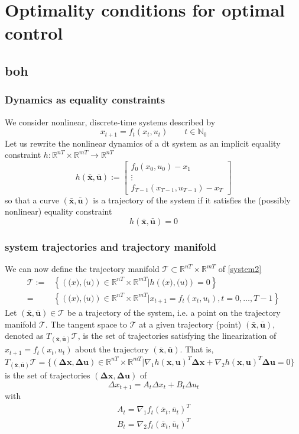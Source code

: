 \documentclass[openany]{book}
\newcommand{\R}{\mathbb{R}} %
\newcommand{\N}{\mathbb{N}} %
\newcommand{\traj}{(\bar{\mathbf{x}},\bar{\mathbf{u}})} %
\theoremstyle{definition}
\theoremstyle{remark}
\begin{document}
\chapter{Optimality conditions for optimal control}
\section{boh}
\subsection{Dynamics as equality constraints}
We consider nonlinear, discrete-time systems described by 
\begin{equation} \label{system2}
    x_{t+1} = f_t(x_t,u_t) \qquad t\in\N_0
\end{equation}
Let us rewrite the nonlinear dynamics of a dt system as an implicit equality constraint $h:\R^{nT}\times \R^{mT}\to\R^{nT}$ 
\[
    h\traj:=\begin{bmatrix}
        f_0(x_0,u_0)-x_1 \\ \vdots \\ f_{T-1}(x_{T-1},u_{T-1})-x_T
    \end{bmatrix}
\]
so that a curve $\traj$ is a trajectory of the system if it satisfies the (possibly nonlinear) equality constraint 
\[
    h\traj = 0
\]
\subsection{system trajectories and trajectory manifold}
We can now define the trajectory manifold $\mathcal{T}\subset \R^{nT}\times \R^{mT}$ of \eqref{system2}
\begin{align*}
    \mathcal{T} := &\left\{\left(\mathbf(x),\mathbf(u)\right)\in\R^{nT}\times\R^{mT}|h\left(\mathbf(x),\mathbf(u)\right)=0\right\}\\=&\left\{\left(\mathbf(x),\mathbf(u)\right)\in\R^{nT}\times\R^{mT}|x_{t+1}=f_t\left(x_t,u_t\right),t=0,\dots,T-1\right\}
\end{align*}
Let $\traj\in\mathcal{T}$ be a trajectory of the system, i.e. a point on the trajectory manifold $\mathcal{T}$. The tangent space to $\mathcal{T}$ at a given trajectory (point) $\traj$, denoted as $T_{(\bar{\mathbf{x}},\bar{\mathbf{u}})}\mathcal{T}$, is the set of trajectories satisfying the linearization of $x_{t+1} = f_t(x_t,u_t)$ about the trajectory $(\bar{\mathbf{x}},\bar{\mathbf{u}})$.
That is, $T_{(\bar{\mathbf{x}},\bar{\mathbf{u}})}\mathcal{T}=\{(\mathbf{\Delta x, \Delta u})\in\R^{nT}\times\R^{mT}|\nabla_1h(\mathbf{x},\mathbf{u})^T\mathbf{\Delta x} + \nabla_2h(\mathbf{x},\mathbf{u})^T\mathbf{\Delta u} = 0\}$ is the set of trajectories $(\mathbf{\Delta x, \Delta u})$ of
\[
    \Delta x_{t+1} = A_t\Delta x_t + B_t \Delta u_t
\]
with 
\begin{gather*}
    A_t = \nabla_1f_t(\bar{x}_t,\bar{u}_t)^T\\
    B_t = \nabla_2f_t(\bar{x}_t,\bar{u}_t)^T
\end{gather*}
\end{document}
